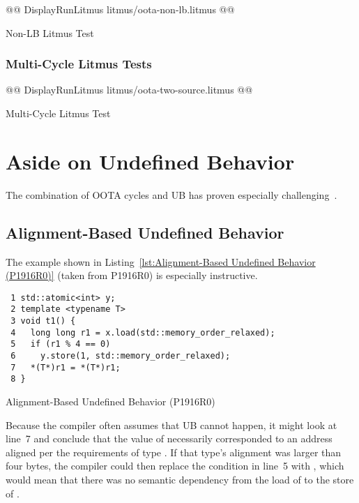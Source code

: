 \documentclass[10]{article}
\begin{document}
\begin{listing}[tbp]
@@ DisplayRunLitmus litmus/oota-non-lb.litmus @@
\caption{Non-LB Litmus Test}
\label{lst:Non-LB Litmus Test}
\end{listing}

\subsubsection{Multi-Cycle Litmus Tests}
\label{app:Multi-Cycle Litmus Tests}

\begin{listing}[tbp]
@@ DisplayRunLitmus litmus/oota-two-source.litmus @@
\caption{Multi-Cycle Litmus Test}
\label{lst:Multi-Cycle Litmus Test}
\end{listing}

\section{Aside on Undefined Behavior}
\label{app:Aside on Undefined Behavior}

The combination of OOTA cycles and UB has proven especially
challenging~\cite{DavidGoldblatt2019NoElegantOOTAfix}.

\subsection{Alignment-Based Undefined Behavior}
\label{sec:Alignment-Based Undefined Behavior}

The example shown in
Listing~\ref{lst:Alignment-Based Undefined Behavior (P1916R0)}
(taken from P1916R0) is especially instructive.

\begin{listing}[tbp]
\begin{verbatim}
 1 std::atomic<int> y;
 2 template <typename T>
 3 void t1() {
 4   long long r1 = x.load(std::memory_order_relaxed);
 5   if (r1 % 4 == 0)
 6     y.store(1, std::memory_order_relaxed);
 7   *(T*)r1 = *(T*)r1;
 8 }
\end{verbatim}
\caption{Alignment-Based Undefined Behavior (P1916R0)}
\label{lst:Alignment-Based Undefined Behavior (P1916R0)}
\end{listing}

Because the compiler often assumes that UB cannot happen, it might
look at line~7 and conclude that the value of  necessarily
corresponded to an address aligned per the requirements of type .
If that type's alignment was larger than four bytes, the compiler could
then replace the condition in line~5 with , which would mean
that there was no semantic dependency from the load of  to the
store of .
\end{document}
